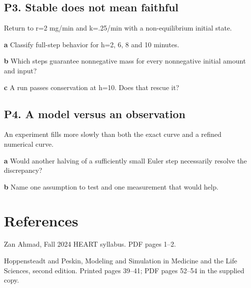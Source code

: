 \documentclass[11pt,letterpaper]{article}
\theoremstyle{definition}\newtheorem{definition}{Definition}\newtheorem{example}{Example}
\numberwithin{equation}{section}
\begin{document}
\par\noindent\begin{minipage}{\linewidth}
\subsection*{P3. Stable does not mean faithful}
Return to r=\allowbreak{}2 mg/min and k=\allowbreak{}.25/min with a non-equilibrium initial state.

\textbf{a} Classify full-step behavior for h=\allowbreak{}2, 6, 8 and 10 minutes.

\end{minipage}\par\medskip
\textbf{b} Which steps guarantee nonnegative mass for every nonnegative initial amount and input?

\textbf{c} A run passes conservation at h=\allowbreak{}10. Does that rescue it?

\par\noindent\begin{minipage}{\linewidth}
\subsection*{P4. A model versus an observation}
An experiment fills more slowly than both the exact curve and a refined numerical curve.

\textbf{a} Would another halving of a sufficiently small Euler step necessarily resolve the discrepancy?

\end{minipage}\par\medskip
\textbf{b} Name one assumption to test and one measurement that would help.

\section*{References}
\noindent\begin{minipage}{\linewidth}
Zan Ahmad, Fall 2024 HEART syllabus. PDF pages 1--2.

\end{minipage}\par\medskip
\noindent\begin{minipage}{\linewidth}
Hoppensteadt and Peskin, Modeling and Simulation in Medicine and the Life Sciences, second edition. Printed pages 39--41; PDF pages 52--54 in the supplied copy.

\end{minipage}\par\medskip
\end{document}
